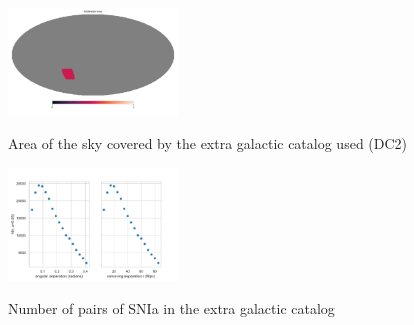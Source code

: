 \begin{figure}
    \begin{center}
        {\includegraphics[width=0.4\textwidth]{figures/catalog_area.pdf}}
        \caption{Area of the sky covered by the extra galactic catalog used (DC2)}
        \label{fig:catalog_area}
    \end{center}
\end{figure}


\begin{figure}
    \begin{center}
        {\includegraphics[width=0.4\textwidth]{figures/NumberPairsatDistance_z0p05.pdf}}
        \caption{Number of pairs of SNIa in the extra galactic catalog }
         \label{fig:num_pairs_cat}
    \end{center}
\end{figure}


